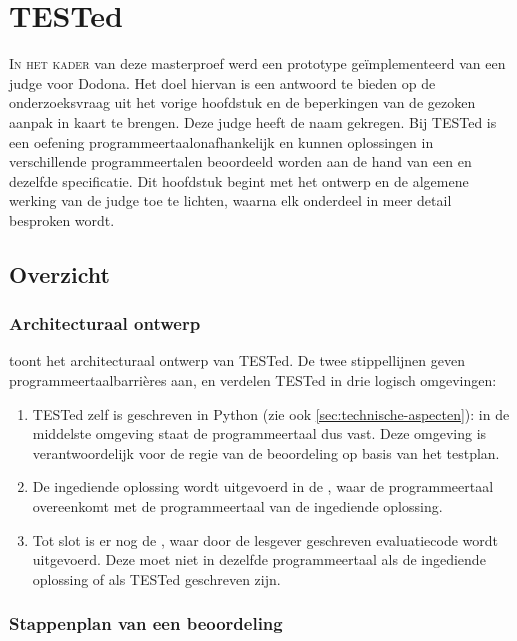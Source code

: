 \chapter{TESTed}\label{ch:tested}

\lettrine{I}{n het kader} van deze masterproef werd een prototype geïmplementeerd van een judge voor Dodona.
Het doel hiervan is een antwoord te bieden op de onderzoeksvraag uit het vorige hoofdstuk en de beperkingen van de gezoken aanpak in kaart te brengen.
Deze judge heeft de naam  gekregen.
Bij TESTed is een oefening programmeertaalonafhankelijk en kunnen oplossingen in verschillende programmeertalen beoordeeld worden aan de hand van een en dezelfde specificatie.
Dit hoofdstuk begint met het ontwerp en de algemene werking van de judge toe te lichten, waarna elk onderdeel in meer detail besproken wordt.

\section{Overzicht}\label{sec:ontwerp}

\subsection{Architecturaal ontwerp}\label{subsec:architecturaal-overzicht}

 toont het architecturaal ontwerp van TESTed.
De twee stippellijnen geven programmeertaalbarrières aan, en verdelen TESTed in drie logisch omgevingen:

\begin{enumerate}
    \item TESTed zelf is geschreven in Python (zie ook \cref{sec:technische-aspecten}): in de middelste omgeving staat de programmeertaal dus vast.
    Deze omgeving is verantwoordelijk voor de regie van de beoordeling op basis van het testplan.
    \item De ingediende oplossing wordt uitgevoerd in de , waar de programmeertaal overeenkomt met de programmeertaal van de ingediende oplossing.
    \item Tot slot is er nog de , waar door de lesgever geschreven evaluatiecode wordt uitgevoerd.
    Deze moet niet in dezelfde programmeertaal als de ingediende oplossing of als TESTed geschreven zijn.
\end{enumerate}

\subsection{Stappenplan van een beoordeling}\label{subsec:stappenplan-van-een-beoordeling}

